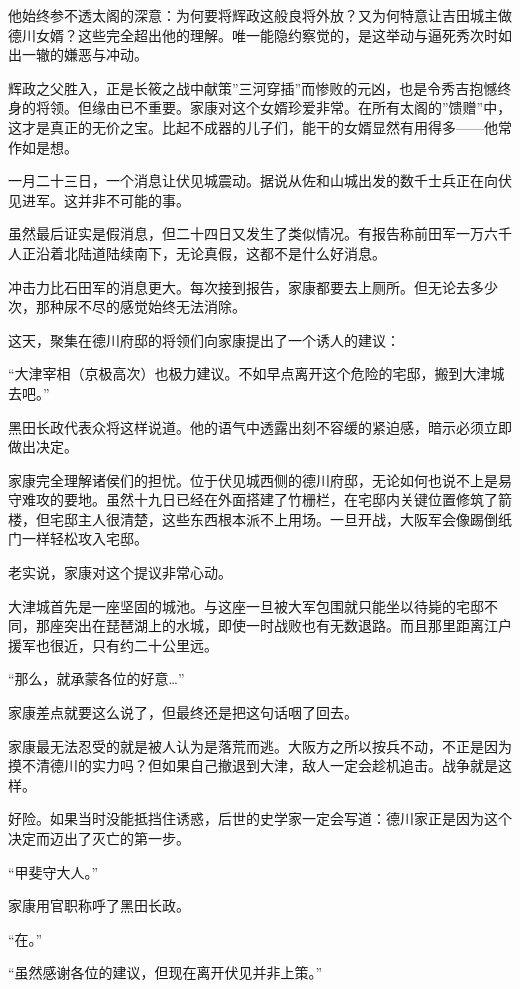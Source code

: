 \documentclass[
]{book}
\begin{document}
他始终参不透太阁的深意：为何要将辉政这般良将外放？又为何特意让吉田城主做德川女婿？这些完全超出他的理解。唯一能隐约察觉的，是这举动与逼死秀次时如出一辙的嫌恶与冲动。

辉政之父胜入，正是长筱之战中献策''三河穿插''而惨败的元凶，也是令秀吉抱憾终身的将领。但缘由已不重要。家康对这个女婿珍爱非常。在所有太阁的''馈赠''中，这才是真正的无价之宝。比起不成器的儿子们，能干的女婿显然有用得多------他常作如是想。

一月二十三日，一个消息让伏见城震动。据说从佐和山城出发的数千士兵正在向伏见进军。这并非不可能的事。

虽然最后证实是假消息，但二十四日又发生了类似情况。有报告称前田军一万六千人正沿着北陆道陆续南下，无论真假，这都不是什么好消息。

冲击力比石田军的消息更大。每次接到报告，家康都要去上厕所。但无论去多少次，那种尿不尽的感觉始终无法消除。

这天，聚集在德川府邸的将领们向家康提出了一个诱人的建议：

``大津宰相（京极高次）也极力建议。不如早点离开这个危险的宅邸，搬到大津城去吧。''

黑田长政代表众将这样说道。他的语气中透露出刻不容缓的紧迫感，暗示必须立即做出决定。

家康完全理解诸侯们的担忧。位于伏见城西侧的德川府邸，无论如何也说不上是易守难攻的要地。虽然十九日已经在外面搭建了竹栅栏，在宅邸内关键位置修筑了箭楼，但宅邸主人很清楚，这些东西根本派不上用场。一旦开战，大阪军会像踢倒纸门一样轻松攻入宅邸。

老实说，家康对这个提议非常心动。

大津城首先是一座坚固的城池。与这座一旦被大军包围就只能坐以待毙的宅邸不同，那座突出在琵琶湖上的水城，即使一时战败也有无数退路。而且那里距离江户援军也很近，只有约二十公里远。

``那么，就承蒙各位的好意\ldots{}''

家康差点就要这么说了，但最终还是把这句话咽了回去。

家康最无法忍受的就是被人认为是落荒而逃。大阪方之所以按兵不动，不正是因为摸不清德川的实力吗？但如果自己撤退到大津，敌人一定会趁机追击。战争就是这样。

好险。如果当时没能抵挡住诱惑，后世的史学家一定会写道：德川家正是因为这个决定而迈出了灭亡的第一步。

``甲斐守大人。''

家康用官职称呼了黑田长政。

``在。''

``虽然感谢各位的建议，但现在离开伏见并非上策。''
\end{document}
